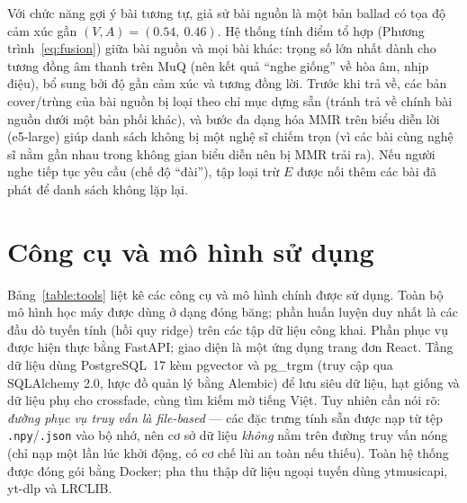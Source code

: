 \documentclass[../DoAn.tex]{subfiles}
\begin{document}
Với chức năng gợi ý bài tương tự, giả sử bài nguồn là một bản ballad có tọa độ cảm xúc gần $(V, A) = (0.54,\ 0.46)$. Hệ thống tính điểm tổ hợp (Phương trình~\eqref{eq:fusion}) giữa bài nguồn và mọi bài khác: trọng số lớn nhất dành cho tương đồng âm thanh trên MuQ (nên kết quả ``nghe giống'' về hòa âm, nhịp điệu), bổ sung bởi độ gần cảm xúc và tương đồng lời. Trước khi trả về, các bản cover/trùng của bài nguồn bị loại theo chỉ mục dựng sẵn (tránh trả về chính bài nguồn dưới một bản phối khác), và bước đa dạng hóa MMR trên biểu diễn lời (e5-large) giúp danh sách không bị một nghệ sĩ chiếm trọn (vì các bài cùng nghệ sĩ nằm gần nhau trong không gian biểu diễn nên bị MMR trải ra). Nếu người nghe tiếp tục yêu cầu (chế độ ``đài''), tập loại trừ $E$ được nối thêm các bài đã phát để danh sách không lặp lại.

\section{Công cụ và mô hình sử dụng}
\label{section:4.3}
Bảng~\ref{table:tools} liệt kê các công cụ và mô hình chính được sử dụng. Toàn bộ mô hình học máy được dùng ở dạng đóng băng; phần huấn luyện duy nhất là các đầu dò tuyến tính (hồi quy ridge) trên các tập dữ liệu công khai. Phần phục vụ được hiện thực bằng FastAPI; giao diện là một ứng dụng trang đơn React. Tầng dữ liệu dùng PostgreSQL~17 kèm pgvector và pg\_trgm (truy cập qua SQLAlchemy 2.0, lược đồ quản lý bằng Alembic) để lưu siêu dữ liệu, hạt giống và dữ liệu phụ cho crossfade, cùng tìm kiếm mờ tiếng Việt. Tuy nhiên cần nói rõ: \textit{đường phục vụ truy vấn là file-based} --- các đặc trưng tính sẵn được nạp từ tệp \texttt{.npy}/\texttt{.json} vào bộ nhớ, nên cơ sở dữ liệu \textit{không} nằm trên đường truy vấn nóng (chỉ nạp một lần lúc khởi động, có cơ chế lùi an toàn nếu thiếu). Toàn hệ thống được đóng gói bằng Docker; pha thu thập dữ liệu ngoại tuyến dùng ytmusicapi, yt-dlp và LRCLIB.
\end{document}
